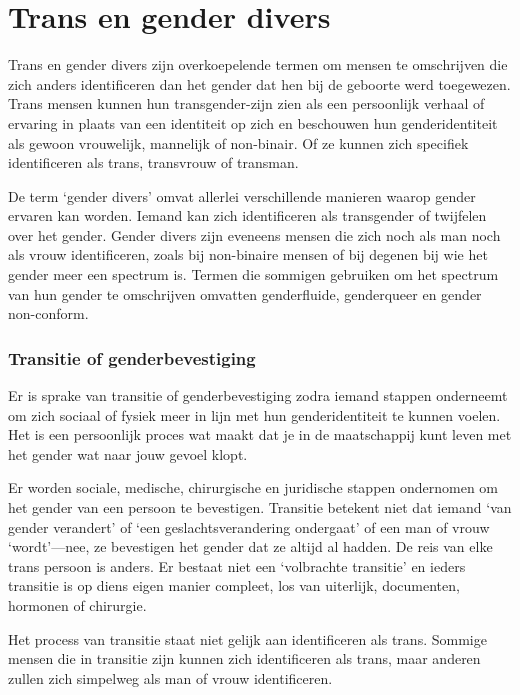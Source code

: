 \documentclass[12pt,openany]{book}
\begin{document}
\section*{Trans en gender divers}

Trans en gender divers zijn overkoepelende termen om mensen te omschrijven die zich anders identificeren dan het gender dat hen bij de geboorte werd toegewezen. Trans mensen kunnen hun transgender-zijn zien als een persoonlijk verhaal of ervaring in plaats van een identiteit op zich en beschouwen hun genderidentiteit als gewoon vrouwelijk, mannelijk of non-binair. Of ze kunnen zich specifiek identificeren als trans, transvrouw of transman.

De term `gender divers' omvat allerlei verschillende manieren waarop gender ervaren kan worden. Iemand kan zich identificeren als transgender of twijfelen over het gender. Gender divers zijn eveneens mensen die zich noch als man noch als vrouw identificeren, zoals bij non-binaire mensen of bij degenen bij wie het gender meer een spectrum is. Termen die sommigen gebruiken om het spectrum van hun gender te omschrijven omvatten genderfluide, genderqueer en gender non-conform. 

\subsubsection*{Transitie of genderbevestiging}

Er is sprake van transitie of genderbevestiging zodra iemand stappen onderneemt om zich sociaal of fysiek meer in lijn met hun genderidentiteit te kunnen voelen. Het is een persoonlijk proces wat maakt dat je in de maatschappij kunt leven met het gender wat naar jouw gevoel klopt.

Er worden sociale, medische, chirurgische en juridische stappen ondernomen om het gender van een persoon te bevestigen. Transitie betekent niet dat iemand `van gender verandert' of `een geslachtsverandering ondergaat' of een man of vrouw `wordt'—nee, ze bevestigen het gender dat ze altijd al hadden. De reis van elke trans persoon is anders. Er bestaat niet een `volbrachte transitie' en ieders transitie is op diens eigen manier compleet, los van uiterlijk, documenten, hormonen of chirurgie.  

Het process van transitie staat niet gelijk aan identificeren als trans. Sommige mensen die in transitie zijn kunnen zich identificeren als trans, maar anderen zullen zich simpelweg als man of vrouw identificeren.
\end{document}
